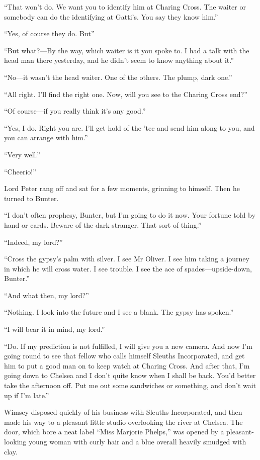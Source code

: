 \enquote{That won't do. We want you to identify him at Charing Cross. The waiter or somebody can do the identifying at Gatti's. You say they know him.}

\enquote{Yes, of course they do. But\longdash}

\enquote{But what?---By the way, which waiter is it you spoke to. I had a talk with the head man there yesterday, and he didn't seem to know anything about it.}

\enquote{No\allowbreak---\allowbreak it wasn't the head waiter. One of the others. The plump, dark one.}

\enquote{All right. I'll find the right one. Now, will you see to the Charing Cross end?}

\enquote{Of course\allowbreak---\allowbreak if you really think it's any good.}

\enquote{Yes, I do. Right you are. I'll get hold of the 'tec and send him along to you, and you can arrange with him.}

\enquote{Very well.}

\enquote{Cheerio!}

Lord Peter rang off and sat for a few moments, grinning to himself. Then he turned to Bunter.

\enquote{I don't often prophesy, Bunter, but I'm going to do it now. Your fortune told by hand or cards. Beware of the dark stranger. That sort of thing.}

\enquote{Indeed, my lord?}

\enquote{Cross the gypsy's palm with silver. I see Mr Oliver. I see him taking a journey in which he will cross water. I see trouble. I see the ace of spades\allowbreak---\allowbreak upside-down, Bunter.}

\enquote{And what then, my lord?}

\enquote{Nothing. I look into the future and I see a blank. The gypsy has spoken.}

\enquote{I will bear it in mind, my lord.}

\enquote{Do. If my prediction is not fulfilled, I will give you a new camera. And now I'm going round to see that fellow who calls himself Sleuths Incorporated, and get him to put a good man on to keep watch at Charing Cross. And after that, I'm going down to Chelsea and I don't quite know when I shall be back. You'd better take the afternoon off. Put me out some sandwiches or something, and don't wait up if I'm late.}

Wimsey disposed quickly of his business with Sleuths Incorporated, and then made his way to a pleasant little studio overlooking the river at Chelsea. The door, which bore a neat label \enquote{Miss Marjorie Phelps,} was opened by a pleasant-looking young woman with curly hair and a blue overall heavily smudged with clay.

